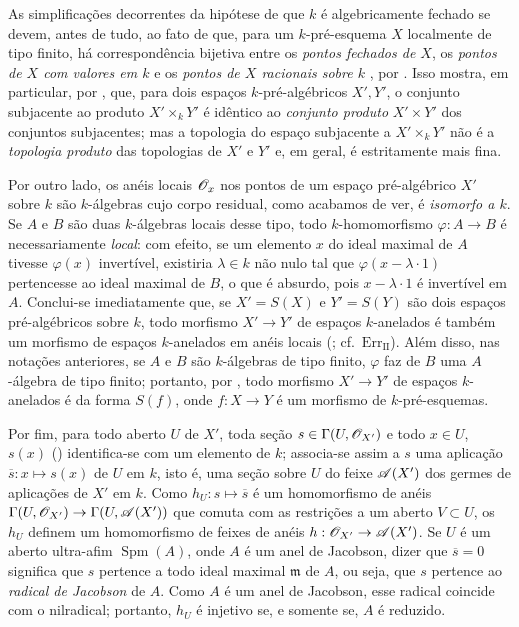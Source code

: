 \begin{env}[10.10.3]
\label{IV.10.10.3}
As simplificações decorrentes da hipótese de que $k$ é algebricamente fechado se devem, antes de tudo, ao fato de que, para um $k$-pré-esquema $X$ localmente de tipo finito, há correspondência bijetiva entre os \emph{pontos fechados de $X$}, os \emph{pontos de $X$ com valores em $k$}  e os \emph{pontos de $X$ racionais sobre $k$} , por .
Isso mostra, em particular, por , que, para dois espaços $k$-pré-algébricos $X',Y'$, o conjunto subjacente ao produto $X'\times_kY'$ é idêntico ao \emph{conjunto produto} $X'\times Y'$ dos conjuntos subjacentes; mas a topologia do espaço subjacente a $X'\times_kY'$ não é a \emph{topologia produto} das topologias de $X'$ e $Y'$ e, em geral, é estritamente mais fina.

Por outro lado, os anéis locais $\mathscr{O}_x$ nos pontos de um espaço pré-algébrico $X'$ sobre $k$ são $k$-álgebras cujo corpo residual, como acabamos de ver, é \emph{isomorfo a $k$}.
Se $A$ e $B$ são duas $k$-álgebras locais desse tipo, todo $k$-homomorfismo $\varphi:A\to B$ é necessariamente \emph{local}: com efeito, se um elemento $x$ do ideal maximal de $A$ tivesse $\varphi(x)$ invertível, existiria $\lambda\in k$ não nulo tal que $\varphi(x-\lambda\cdot1)$ pertencesse ao ideal maximal de $B$, o que é absurdo, pois $x-\lambda\cdot1$ é invertível em $A$.
Conclui-se imediatamente que, se $X'=S(X)$ e $Y'=S(Y)$ são dois espaços pré-algébricos sobre $k$, todo morfismo $X'\to Y'$ de espaços $k$-anelados é também um morfismo de espaços $k$-anelados em anéis locais (; cf.\ $\mathrm{Err}_{\mathrm{II}}$).
Além disso, nas notações anteriores, se $A$ e $B$ são $k$-álgebras de tipo finito, $\varphi$ faz de $B$ uma $A$-álgebra de tipo finito; portanto, por , todo morfismo $X'\to Y'$ de espaços $k$-anelados é da forma $S(f)$, onde $f:X\to Y$ é um morfismo de $k$-pré-esquemas.

Por fim, para todo aberto $U$ de $X'$, toda seção $s\in\Gamma(U,\mathscr{O}_{X'})$ e todo $x\in U$, $s(x)$ () identifica-se com um elemento de $k$; associa-se assim a $s$ uma aplicação $\overline{s}:x\mapsto s(x)$ de $U$ em $k$, isto é, uma seção sobre $U$ do feixe $\mathscr{A}(X')$ dos germes de aplicações de $X'$ em $k$.
Como $h_U:s\mapsto\overline{s}$ é um homomorfismo de anéis $\Gamma(U,\sh{O}_{X'})\to\Gamma(U,\sh{A}(X'))$ que comuta com as restrições a um aberto $V\subset U$, os $h_U$ definem um homomorfismo de feixes de anéis $h:\sh{O}_{X'}\to\sh{A}(X')$.
Se $U$ é um aberto ultra-afim $\operatorname{Spm}(A)$, onde $A$ é um anel de Jacobson, dizer que $\overline{s}=0$ significa que $s$ pertence a todo ideal maximal $\mathfrak m$ de $A$, ou seja, que $s$ pertence ao \emph{radical de Jacobson} de $A$.
Como $A$ é um anel de Jacobson, esse radical coincide com o nilradical; portanto, $h_U$ é injetivo se, e somente se, $A$ é reduzido.
\end{env}

